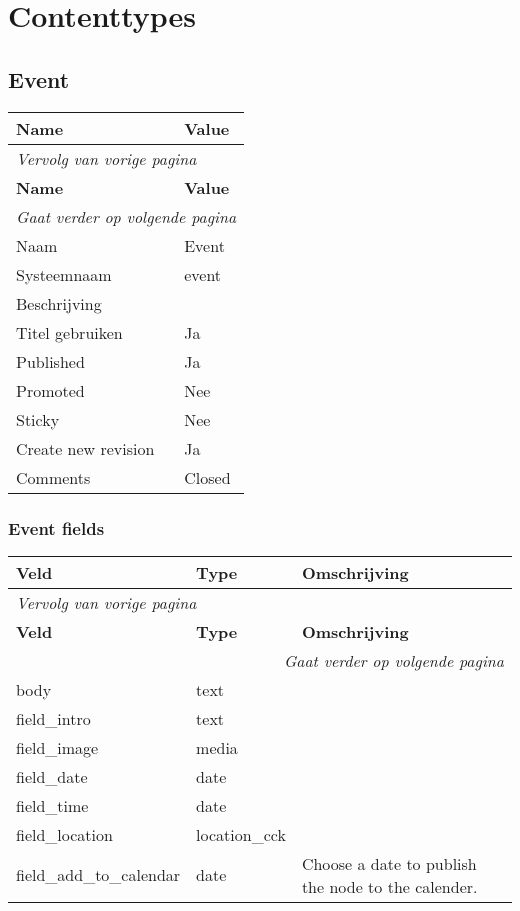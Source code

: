 \section{Contenttypes}\label{contenttypes}

\subsection{Event}
\label{sec:content-event}
  \begin{longtable}{| p{7.50cm}|p{7.50cm}|}
  \hline
  \rowcolor{tableheader}
  \textbf{Name} & \textbf{Value}  \tabularnewline
  \hline
\endfirsthead
\multicolumn{2}{l}{\textit{Vervolg van vorige pagina}} \\
\hline
\rowcolor{tableheader}
  \textbf{Name} & \textbf{Value}  \tabularnewline
  \hline
\hline
\endhead
\multicolumn{2}{r}{\textit{Gaat verder op volgende pagina}} \\
\endfoot
\hline
\endlastfoot
  Naam & Event  \tabularnewline
  \hline
  Systeemnaam & event    \tabularnewline
  \hline
  Beschrijving &   \tabularnewline
  \hline
  Titel gebruiken & Ja  \tabularnewline
  \hline
  Published & Ja  \tabularnewline
  \hline
  Promoted & Nee  \tabularnewline
  \hline
  Sticky & Nee  \tabularnewline
  \hline
  Create new revision & Ja  \tabularnewline
  \hline
  Comments & Closed  \tabularnewline
  \hline
  \end{longtable}

\subsubsection{Event fields}
  \begin{longtable}{| p{5.00cm}|p{5.00cm}|p{5.00cm}|}
  \hline
  \rowcolor{tableheader}
  \textbf{Veld} & \textbf{Type} & \textbf{Omschrijving}  \tabularnewline
  \hline
\endfirsthead
\multicolumn{3}{l}{\textit{Vervolg van vorige pagina}} \\
\hline
\rowcolor{tableheader}
  \textbf{Veld} & \textbf{Type} & \textbf{Omschrijving}  \tabularnewline
  \hline
\hline
\endhead
\multicolumn{3}{r}{\textit{Gaat verder op volgende pagina}} \\
\endfoot
\hline
\endlastfoot
  body & text &   \tabularnewline
  \hline
  field\_intro & text &   \tabularnewline
  \hline
  field\_image & media &   \tabularnewline
  \hline
  field\_date & date &   \tabularnewline
  \hline
  field\_time & date &   \tabularnewline
  \hline
  field\_location & location\_cck &   \tabularnewline
  \hline
  field\_add\_to\_calendar & date & Choose a date to publish the node to the calender.  \tabularnewline
  \hline
  \end{longtable}

